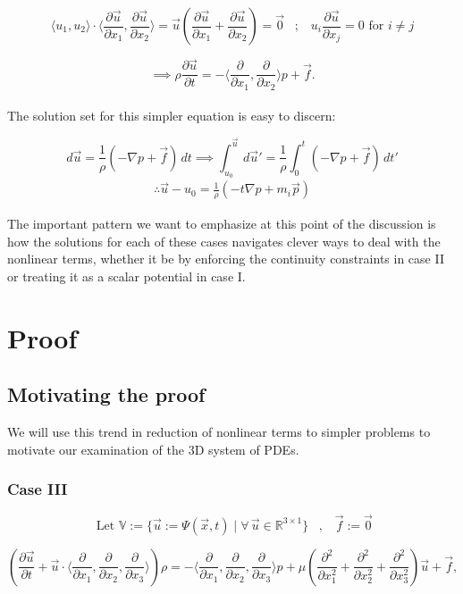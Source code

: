 \documentclass[12pt]{article}
\begin{document}
\[
 \langle u_{1}, u_{2} \rangle \cdot \langle \frac{\partial \vec u}{\partial x_1}, \frac{\partial \vec u}{\partial x_2}  \rangle = \vec u \left(\frac{\partial \vec u }{\partial x_1} + \frac{\partial \vec u }{\partial x_2}\right) = \vec 0 \;\;\;;\;\;\; u_{i} \frac{\partial \vec u}{\partial x_{j}} = 0 \text{ for } i \ne j
\]

\[
\implies \rho \frac{\partial \vec{u}}{\partial t} = -\langle \frac{\partial}{\partial x_1}, \frac{\partial}{\partial x_2} \rangle p + \vec{f}.
\]\\
The solution set for this simpler equation is easy to discern:

\[
d \vec u = \frac{1}{\rho} (-\nabla p + \vec f)\, dt \implies \int_{u_{0}}^{\vec u} d \vec u' = \frac{1}{\rho} \int_{0}^{t} (-\nabla p + \vec f)\, dt'
\]
\begin{align}
    \therefore \vec u - u_{0} = \frac{1}{\rho}\left(- t \nabla p + m_{i}\vec p\right) 
\end{align}

The important pattern we want to emphasize at this point of the discussion is how the solutions for each of these cases navigates clever ways to deal with the nonlinear terms, whether it be by enforcing the continuity constraints in case II or treating it as a scalar potential in case I. 

\section{Proof}

\subsection{Motivating the proof}
We will use this trend in reduction of nonlinear terms to simpler problems to motivate our examination of the 3D system of PDEs. 

\subsubsection {Case III}
\textbf{\[\text{ Let } \mathbb{V} := \{\vec u := \Psi (\vec x,t)\;|\;\forall \,\vec u \in \mathbb{R}^{3 \times 1} \}\;\;\;,\;\;\; \vec f := \vec 0 \]}

\[
\left( \frac{\partial \vec{u}}{\partial t} + \vec{u} \cdot \langle \frac{\partial}{\partial x_1}, \frac{\partial}{\partial x_2}, \frac{\partial}{\partial x_{3}} \rangle \right) \rho = 
-\langle \frac{\partial}{\partial x_1}, \frac{\partial}{\partial x_2}, \frac{\partial}{\partial x_{3}} \rangle p + 
\mu \left( \frac{\partial^2}{\partial x_1^2} + \frac{\partial^2}{\partial x_2^2} + \frac{\partial^{2}}{\partial x_{3}^{2}}\right) \vec{u} + 
\vec{f},
\]
\end{document}
